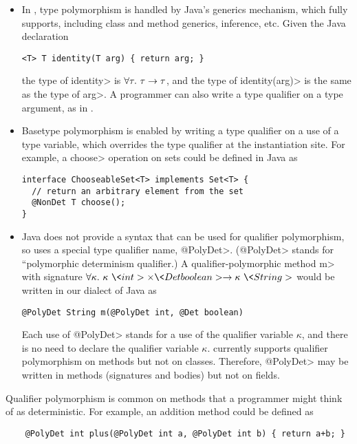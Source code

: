 \begin{itemize}
\item
In \theDeterminismCheckerImplementation,
type polymorphism is handled by Java's generics mechanism, which
\theDeterminismChecker fully supports, including class and method generics,
inference, etc.
Given the Java declaration
\begin{Verbatim}
<T> T identity(T arg) { return arg; }
\end{Verbatim}
the type of \<identity> is $\forall \tau . \  \tau \rightarrow \tau$, and
the type of \<identity(arg)> is the same as the type of
\<arg>.  A programmer can also write a type qualifier on a type argument,
as in .
\item
Basetype polymorphism is enabled by writing a type qualifier on a use of a
type variable, which overrides the type qualifier at the instantiation
site.
For example, a \<choose> operation on sets could be defined in Java as
\begin{Verbatim}
interface ChooseableSet<T> implements Set<T> {
  // return an arbitrary element from the set
  @NonDet T choose();
}
\end{Verbatim}
\item
Java does not provide a syntax that can be used for qualifier polymorphism,
so \theDeterminismChecker uses a special type qualifier name, \<@PolyDet>.  (\<@PolyDet> stands
for ``polymorphic determinism qualifier.)
A qualifier-polymorphic method \<m> with signature $\forallt{\kappa} \kappa\ \<int> \times \<Det boolean> \rightarrow
\kappa\ \<String>$ would be written in our dialect of Java as
\begin{Verbatim}
@PolyDet String m(@PolyDet int, @Det boolean)
\end{Verbatim}
Each use of \<@PolyDet> stands for a use of the qualifier variable
$\kappa$, and there is no need to declare the qualifier variable $\kappa$.
\TheDeterminismChecker currently supports
qualifier
polymorphism on methods but not on classes.
Therefore, \<@PolyDet> may be written in methods (signatures and bodies)
but not on fields.
\end{itemize}

Qualifier  polymorphism is common on methods that a programmer might think
of as deterministic.  For example, an addition method could be defined as

\begin{verbatim}
    @PolyDet int plus(@PolyDet int a, @PolyDet int b) { return a+b; }
\end{verbatim}


